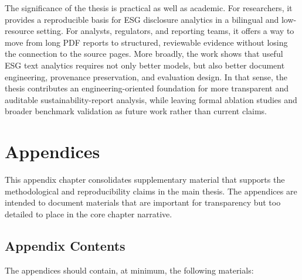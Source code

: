 \documentclass[english, online, cse, master]{dithesis}
\begin{document}
The significance of the thesis is practical as well as academic. For researchers, it provides a reproducible basis for ESG disclosure analytics in a bilingual and low-resource setting. For analysts, regulators, and reporting teams, it offers a way to move from long PDF reports to structured, reviewable evidence without losing the connection to the source pages. More broadly, the work shows that useful ESG text analytics requires not only better models, but also better document engineering, provenance preservation, and evaluation design. In that sense, the thesis contributes an engineering-oriented foundation for more transparent and auditable sustainability-report analysis, while leaving formal ablation studies and broader benchmark validation as future work rather than current claims.
     
\printbibliography[heading=bibnumbered, title=\mybibname]

\startappendix
\chapter{Appendices}
  































This appendix chapter consolidates supplementary material that supports the methodological and reproducibility claims in the main thesis. The appendices are intended to document materials that are important for transparency but too detailed to place in the core chapter narrative.

\section{Appendix Contents}\label{appendix-contents}

The appendices should contain, at minimum, the following materials:
\end{document}
